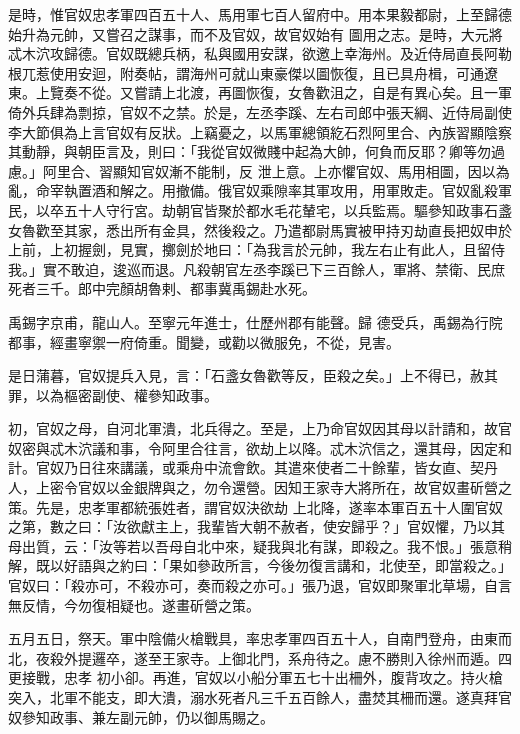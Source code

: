 \begin{pinyinscope}
 是時，惟官奴忠孝軍四百五十人、馬用軍七百人留府中。用本果毅都尉，上至歸德始升為元帥，又嘗召之謀事，而不及官奴，故官奴始有
 圖用之志。是時，大元將忒木泬攻歸德。官奴既總兵柄，私與國用安謀，欲邀上幸海州。及近侍局直長阿勒根兀惹使用安迴，附奏帖，謂海州可就山東豪傑以圖恢復，且已具舟楫，可通遼東。上覽奏不從。又嘗請上北渡，再圖恢復，女魯歡沮之，自是有異心矣。且一軍倚外兵肆為剽掠，官奴不之禁。於是，左丞李蹊、左右司郎中張天綱、近侍局副使李大節俱為上言官奴有反狀。上竊憂之，以馬軍總領紇石烈阿里合、內族習顯陰察其動靜，與朝臣言及，則曰：「我從官奴微賤中起為大帥，何負而反耶？卿等勿過慮。」阿里合、習顯知官奴漸不能制，反
 泄上意。上亦懼官奴、馬用相圖，因以為亂，命宰執置酒和解之。用撤備。俄官奴乘隙率其軍攻用，用軍敗走。官奴亂殺軍民，以卒五十人守行宮。劫朝官皆聚於都水毛花輦宅，以兵監焉。驅參知政事石盞女魯歡至其家，悉出所有金具，然後殺之。乃遣都尉馬實被甲持刃劫直長把奴申於上前，上初握劍，見實，擲劍於地曰：「為我言於元帥，我左右止有此人，且留侍我。」實不敢迫，逡巡而退。凡殺朝官左丞李蹊已下三百餘人，軍將、禁衛、民庶死者三千。郎中完顏胡魯剌、都事冀禹錫赴水死。



 禹錫字京甫，龍山人。至寧元年進士，仕歷州郡有能聲。歸
 德受兵，禹錫為行院都事，經畫寧禦一府倚重。聞變，或勸以微服免，不從，見害。



 是日蒲暮，官奴提兵入見，言：「石盞女魯歡等反，臣殺之矣。」上不得已，赦其罪，以為樞密副使、權參知政事。



 初，官奴之母，自河北軍潰，北兵得之。至是，上乃命官奴因其母以計請和，故官奴密與忒木泬議和事，令阿里合往言，欲劫上以降。忒木泬信之，還其母，因定和計。官奴乃日往來講議，或乘舟中流會飲。其遣來使者二十餘輩，皆女直、契丹人，上密令官奴以金銀牌與之，勿令還營。因知王家寺大將所在，故官奴畫斫營之策。先是，忠孝軍都統張姓者，謂官奴決欲劫
 上北降，遂率本軍百五十人圍官奴之第，數之曰：「汝欲獻主上，我輩皆大朝不赦者，使安歸乎？」官奴懼，乃以其母出質，云：「汝等若以吾母自北中來，疑我與北有謀，即殺之。我不恨。」張意稍解，既以好語與之約曰：「果如參政所言，今後勿復言講和，北使至，即當殺之。」官奴曰：「殺亦可，不殺亦可，奏而殺之亦可。」張乃退，官奴即聚軍北草場，自言無反情，今勿復相疑也。遂畫斫營之策。



 五月五日，祭天。軍中陰備火槍戰具，率忠孝軍四百五十人，自南門登舟，由東而北，夜殺外提邏卒，遂至王家寺。上御北門，系舟待之。慮不勝則入徐州而遁。四更接戰，忠孝
 初小卻。再進，官奴以小船分軍五七十出柵外，腹背攻之。持火槍突入，北軍不能支，即大潰，溺水死者凡三千五百餘人，盡焚其柵而還。遂真拜官奴參知政事、兼左副元帥，仍以御馬賜之。




\end{pinyinscope}
